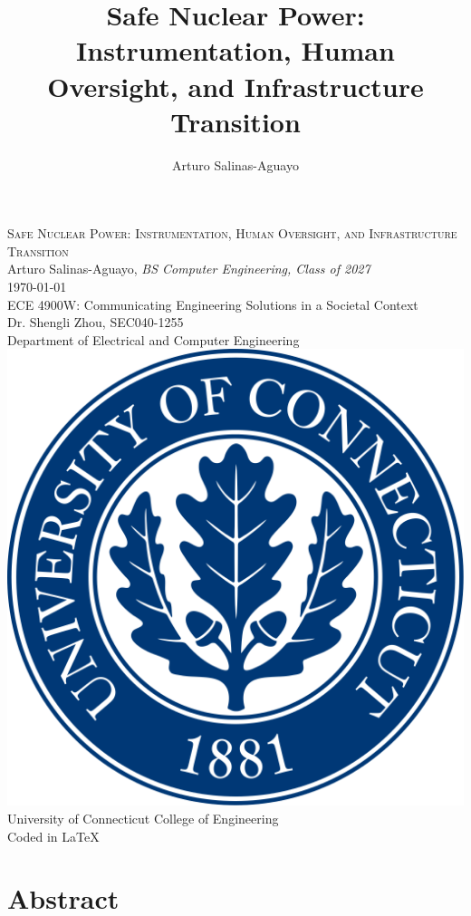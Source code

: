 \documentclass[12pt]{article}
\title{\bfseries\LARGE Safe Nuclear Power: Instrumentation, Human Oversight, and Infrastructure Transition}
\author{Arturo Salinas-Aguayo}
\begin{document}
\begin{titlepage}
    \centering
    \vspace*{3cm}
    {\Large \textsc{Safe Nuclear Power: Instrumentation, Human Oversight, and Infrastructure Transition}}\\
		Arturo Salinas-Aguayo, \textit{BS Computer Engineering, Class of 2027}\\
		\today\\
    \vspace{1.5cm}
    ECE 4900W: Communicating Engineering Solutions in a Societal Context\\
    Dr. Shengli Zhou, SEC040-1255\\
    Department of Electrical and Computer Engineering\\
    \vfill
    \includegraphics[scale=0.1]{uconnlogo}\\[1em]
    University of Connecticut College of Engineering\\
    \small\tiny{Coded in \LaTeX} \\
    \vspace{1cm}
\end{titlepage}
\newpage

\tableofcontents

\newpage

\section*{Abstract}
\end{document}
